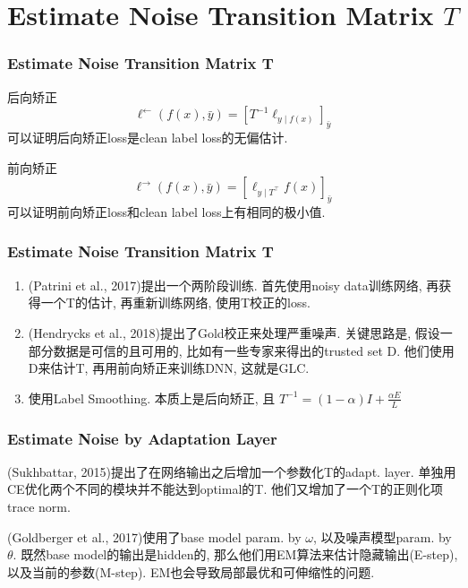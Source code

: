 \documentclass{beamer}
\begin{document}
\section{Estimate Noise Transition Matrix $T$}

\begin{frame}
    \frametitle{Estimate Noise Transition Matrix $\bm T$}
    
    \begin{definition}
        后向矫正
        \begin{equation}
            \ell^{\leftarrow}(f(x), \bar{y})=\left[T^{-1} \ell_{y \mid f(x)}\right]_{\bar{y}}
        \end{equation}
        可以证明后向矫正loss是clean label loss的无偏估计.
    \end{definition}
    

    \begin{definition}
        前向矫正
        \begin{equation}
            \ell^{\rightarrow}(f(x), \bar{y})=\left[\ell_{y \mid T^{\top}} f(x)\right]_{\bar{y}}
        \end{equation}
        可以证明前向矫正loss和clean label loss上有相同的极小值.
    \end{definition}
    
\end{frame}

\begin{frame}
    \frametitle{Estimate Noise Transition Matrix $\bm T$}

    \begin{enumerate}
        \item (Patrini et al., 2017)提出一个两阶段训练. 首先使用noisy data训练网络, 再获得一个T的估计, 再重新训练网络, 使用T校正的loss.
        \item (Hendrycks et al., 2018)提出了Gold校正来处理严重噪声. 关键思路是, 假设一部分数据是可信的且可用的, 比如有一些专家来得出的trusted set D. 他们使用D来估计T, 再用前向矫正来训练DNN, 这就是GLC.
        \item 使用Label Smoothing. 本质上是后向矫正, 且
        $T^{-1}=(1-\alpha) I+\frac{\alpha E}{L}$
    \end{enumerate}

\end{frame}

\begin{frame}
    \frametitle{Estimate Noise by Adaptation Layer}

    (Sukhbattar, 2015)提出了在网络输出之后增加一个参数化T的adapt. layer. 单独用CE优化两个不同的模块并不能达到optimal的T. 他们又增加了一个T的正则化项 trace norm.

    (Goldberger et al., 2017)使用了base model param. by $\omega$, 以及噪声模型param. by $\theta$. 既然base model的输出是hidden的, 那么他们用EM算法来估计隐藏输出(E-step), 以及当前的参数(M-step). EM也会导致局部最优和可伸缩性的问题.

\end{frame}
\end{document}
